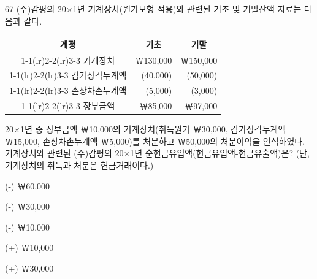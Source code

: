 \begin{question}{67}
(주)감평의 20×1년 기계장치(원가모형 적용)와 관련된 기초 및 기말잔액 자료는 다음과 같다.
\begin{tcolorbox}[enhanced, colback=white, colframe=black, boxrule=0.4pt, arc=0pt, left=4pt, right=4pt, top=4pt, bottom=4pt]
\begin{center}\small
\begin{tabular}{c r r}
계정 & \multicolumn{1}{c}{기초} & \multicolumn{1}{c}{기말} \\ \cmidrule(lr){1-1}\cmidrule(lr){2-2}\cmidrule(lr){3-3}
기계장치 & ￦130,000 & ￦150,000 \\ \cmidrule(lr){1-1}\cmidrule(lr){2-2}\cmidrule(lr){3-3}
감가상각누계액 & (40,000) & (50,000) \\ \cmidrule(lr){1-1}\cmidrule(lr){2-2}\cmidrule(lr){3-3}
손상차손누계액 & (5,000) & (3,000) \\ \cmidrule(lr){1-1}\cmidrule(lr){2-2}\cmidrule(lr){3-3}
장부금액 & ￦85,000 & ￦97,000
\end{tabular}
\end{center}
\end{tcolorbox}
20×1년 중 장부금액 ￦10,000의 기계장치(취득원가 ￦30,000, 감가상각누계액 ￦15,000, 손상차손누계액 ￦5,000)를 처분하고 ￦50,000의 처분이익을 인식하였다. 기계장치와 관련된 (주)감평의 20×1년 순현금유입액(현금유입액-현금유출액)은? (단, 기계장치의 취득과 처분은 현금거래이다.)
\begin{choices}
  \item (-) ￦60,000
  \item (-) ￦30,000
  \item (-) ￦10,000
  \item (+) ￦10,000
  \item (+) ￦30,000
\end{choices}
\end{question}
